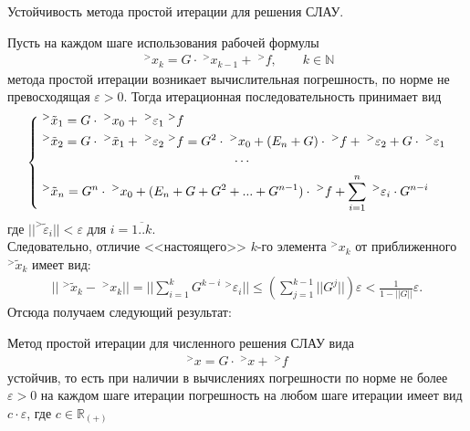 \documentclass[__main__.tex]{subfiles}
\begin{document}
Устойчивость метода простой итерации для решения СЛАУ.


Пусть на каждом шаге использования рабочей формулы 
\begin{gather*}
\;^>x_k=G\cdot \;^>x_{k-1}+\;^>f, \qquad k \in \mathbb N
\end{gather*}
метода простой итерации возникает вычислительная погрешность, по норме не превосходящая $\varepsilon >0$. Тогда итерационная последовательность принимает вид 
\begin{gather*}
\left\{
	\begin{gathered}
	\;^>\tilde{x}_1=G\cdot \;^>x_0+\;^>\varepsilon_{1}\;^>f \hfill \\ 
	\;^>\tilde{x}_2=G\cdot \;^>\tilde{x}_1+\;^>\varepsilon_{2}\;^>f = G^2\cdot \;^>x_0+(E_n+G)\cdot\;^>f+\;^>\varepsilon_2+G\cdot \;^>\varepsilon_1\hfill \\ 
	\cdots \\
	\;^>\tilde{x}_n= G^n\cdot \;^>x_0+(E_n+G+G^2+...+G^{n-1})\cdot\;^>f+\sum\limits_{i=1}^n\;^>\varepsilon_i\cdot G^{n-i}\hfill \\ 
	\end{gathered}
\right.
\end{gather*}
где $||^>\tilde{\varepsilon}_i||<\varepsilon$ для $i=\overline{1..k}$.\\
Следовательно, отличие <<настоящего>> $k$-го элемента $^>x_k$ от приближенного $^>\tilde{x}_k$ имеет вид:
\begin{gather*}
||\;^>\tilde{x}_k-\;^>x_k||=||\sum\limits_{i=1}^k G^{k-i}\;^>\varepsilon_i|| \leqslant \left(\sum\limits_{j=1}^{k-1}||G^j||\right)\varepsilon < \frac{1}{1-||G||} \varepsilon. 
\end{gather*}
Отсюда получаем следующий результат:
\begin{theorem}
Метод простой итерации для численного решения СЛАУ вида
\begin{gather*}
^>x=G\cdot \; ^>x+\;^>f
\end{gather*}
устойчив, то есть при наличии в вычислениях погрешности по норме не более $\varepsilon > 0$ на каждом шаге итерации погрешность на любом шаге итерации имеет вид $c\cdot \varepsilon $, где $c \in \mathbb R_{(+)}$
\end{theorem}
\end{document}
